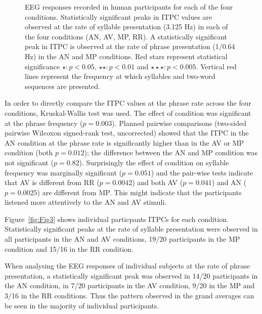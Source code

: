 \documentclass[10pt,letterpaper]{article}
\begin{document}
\begin{figure}[tbhp]

\caption{EEG responses recorded in human participants for  each of the
  four conditions. Statistically significant peaks in ITPC values are
  observed at the rate of syllable presentation (3.125 Hz) in each of
  the four conditions (AN, AV, MP, RR). A statistically significant
  peak in ITPC is observed at the rate of phrase presentation (1/0.64
  Hz) in the AN and MP conditions. Red stars
  represent statistical significance $\star: p<0.05$, $\star\star: p<0.01$ and
  $\star\star\star: p<0.005$. Vertical red lines represent the
  frequency at which syllables and two-word sequences are presented.}
\label{fig:Fig2}
\end{figure}

In order to directly compare the ITPC values at the phrase rate across
the four conditions, Kruskal-Wallis test was used. The effect of
condition was significant at the phrase frequency ($p=0.003$). Planned
pairwise comparisons (two-sided pairwise Wilcoxon signed-rank test,
uncorrected) showed that the ITPC in the AN condition at the phrase
rate is significantly higher than in the AV or MP condition (both
$p=0.012$); the difference between the AN and MP condition was not
significant ($p=0.82$). Surprisingly the effect of condition on
syllable frequency was marginally significant ($p=0.051$) and the
pair-wise tests indicate that AV is different from RR ($p=0.0042$) and
both AV ($p=0.041$) and AN ($p=0.0025$) are different from MP. This
might indicate that the participants listened more attentively to the
AN and AV stimuli.


Figure~\ref{fig:Fig3} shows individual particpants ITPCs for each
condition. Statistically significant peaks at the rate of syllable
presentation were observed in all participants in the AN and AV
conditions, 19/20 participants in the MP condition and 15/16 in the RR
condition.

When analysing the EEG responses of individual subjects at the rate of
phrase presentation, a statistically significant peak was observed in
14/20 participants in the AN condition, in 7/20 participants in the AV
condition, 9/20 in the MP and 3/16 in the RR conditions. Thus the
pattern observed in the grand averages can be seen in the majority of
individual participants.
\end{document}
